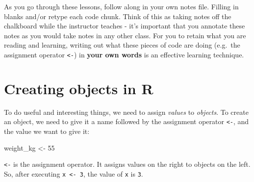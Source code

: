 \documentclass[
  letterpaper,
  DIV=11,
  numbers=noendperiod,
  oneside]{scrreprt}
\newenvironment{Shaded}{\begin{snugshade}}{\end{snugshade}}
\newcommand{\DecValTok}[1]{\textcolor[rgb]{0.68,0.00,0.00}{#1}}
\newcommand{\NormalTok}[1]{\textcolor[rgb]{0.00,0.23,0.31}{#1}}
\newcommand{\OtherTok}[1]{\textcolor[rgb]{0.00,0.23,0.31}{#1}}
\begin{document}
As you go through these lessons, follow along in your own notes file.
Filling in blanks and/or retype each code chunk. Think of this as taking
notes off the chalkboard while the instructor teaches - it's important
that you annotate these notes as you would take notes in any other
class. For you to retain what you are reading and learning, writing out
what these pieces of code are doing (e.g.~the assignment operator
\texttt{\textless{}-}) in \textbf{your own words} is an effective
learning technique.

\section{Creating objects in R}\label{creating-objects-in-r}

To do useful and interesting things, we need to assign \emph{values} to
\emph{objects}. To create an object, we need to give it a name followed
by the assignment operator \texttt{\textless{}-}, and the value we want
to give it:

\begin{Shaded}
\begin{Highlighting}[]
\NormalTok{weight\_kg }\OtherTok{\textless{}{-}} \DecValTok{55}
\end{Highlighting}
\end{Shaded}

\texttt{\textless{}-} is the assignment operator. It assigns values on
the right to objects on the left. So, after executing
\texttt{x\ \textless{}-\ 3}, the value of \texttt{x} is \texttt{3}.
\end{document}
